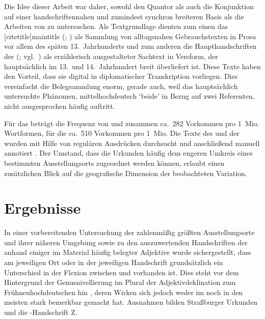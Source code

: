 Die Idee dieser Arbeit war daher, sowohl den Quantor als auch die Konjunktion
 auf einer handschriftennahen und zumindest synchron breiteren
Basis als die Arbeiten von \citet{askedal1973,askedal1974} zu untersuchen. Als
Textgrundlage dienten zum einen das [citetitle]{maintitle}
(\CAO{}; \nosh\cites{cao1,cao2,cao3,cao4,caor,cao5}) als Sammlung von
alltagsnahen Gebrauchstexten in Prosa vor allem des späten 13.~Jahrhunderts und
zum anderen die Haupthandschriften der  (\KC{};
vgl.~\cites{schroeder1895,nellmann1983}) als erzählerisch ausgestalteter
Sachtext in Versform, der hauptsächlich im 13.\ und 14.\ Jahrhundert breit
über\-liefert ist. Diese Texte haben den Vorteil, dass sie digital in
diplomatischer Transkription vorliegen. Dies vereinfacht die Belegsammlung
enorm, gerade auch, weil das hauptsächlich untersuchte Phänomen,
mittelhochdeutsch  `beide' in Bezug auf zwei
Referenten, nicht ausgesprochen häufig auftritt.

Für das \CAO{} beträgt die Frequenz von  und 
zusammen ca.~282 Vorkommen pro 1~Mio. Wortformen, für die \KC{} ca.~510
Vorkommen pro 1~Mio. Die Texte des \CAO{} und der \KC{} wurden
mit Hilfe von regulären Ausdrücken durchsucht und anschließend manuell
annotiert \autocites[vgl.\ z.\,B.][33--37]{perkuhnetal2012}[zur Methode
vgl.][207--209]{beckerschallert2021}[155--158]{beckerschallert2022b}. Der
Umstand, dass die Urkunden häufig dem engeren Umkreis eines bestimmten
Ausstellungs\-orts zugeordnet werden können, erlaubt einen zusätzlichen Blick
auf die geografische Dimension der beobachteten Variation.

\section{Ergebnisse}

In einer vorbereitenden Untersuchung der zahlenmäßig größten Ausstellungsorte
und ihrer näheren Umgebung sowie zu den auszuwertenden Handschriften der
\KC{} anhand einiger im Material häufig belegter Adjektive wurde
sichergestellt, dass am jeweiligen Ort oder in der jeweiligen Handschrift
grundsätzlich ein Unterschied in der Flexion zwischen  und
 vorhanden ist. Dies steht vor dem Hintergrund der Genusnivellierung
im Plural der Adjektivdeklination zum
Frühneuhochdeutschen hin
\autocite[191--192]{reichmannwegera1993}, deren Wirken sich jedoch weder im
\CAO{} noch in den meisten \KC{} stark bemerkbar gemacht hat.
Ausnahmen bilden Straßburger Urkunden und die \KC{}-Handschrift
Z.

